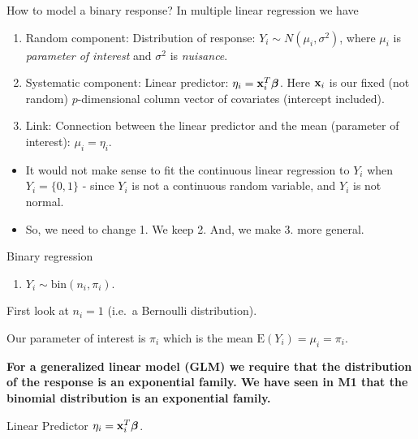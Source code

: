 \documentclass[
  ignorenonframetext,
]{beamer}
\providecommand{\tightlist}{%
  \setlength{\itemsep}{0pt}\setlength{\parskip}{0pt}}
\begin{document}
\begin{frame}{How to model a binary response?}
\protect\hypertarget{how-to-model-a-binary-response}{}
In multiple linear regression we have

\begin{enumerate}
\item
  Random component: Distribution of response:
  \(Y_i\sim N(\mu_i,\sigma^2)\), where \(\mu_i\) is \emph{parameter of
  interest} and \(\sigma^2\) is \emph{nuisance}.
\item
  Systematic component: Linear predictor:
  \(\eta_i={\bf x}_i^T \boldsymbol{\beta}\). Here \({\bf x}_i\) is our
  fixed (not random) \(p\)-dimensional column vector of covariates
  (intercept included).
\item
  Link: Connection between the linear predictor and the mean (parameter
  of interest): \(\mu_i=\eta_i\).
\end{enumerate}

\begin{itemize}
\tightlist
\item
  It would not make sense to fit the continuous linear regression to
  \(Y_i\) when \(Y_i=\{0,1\}\) - since \(Y_i\) is not a continuous
  random variable, and \(Y_i\) is not normal.
\item
  So, we need to change 1. We keep 2. And, we make 3. more general.
\end{itemize}
\end{frame}

\begin{frame}
\begin{block}{Binary regression}
\protect\hypertarget{binary-regression}{}
\begin{enumerate}
\tightlist
\item
  \(Y_i \sim \text{bin}(n_i,\pi_i)\).
\end{enumerate}

First look at \(n_i=1\) (i.e.~a Bernoulli distribution).

Our parameter of interest is \(\pi_i\) which is the mean
\(\text{E}(Y_i)=\mu_i=\pi_i\).

\textbf{For a generalized linear model (GLM) we require that the
distribution of the response is an exponential family. We have seen in
M1 that the binomial distribution is an exponential family.}
\end{block}
\end{frame}

\begin{frame}
\begin{block}{Linear Predictor}
\protect\hypertarget{linear-predictor}{}
\(\eta_i={\bf x}_i^T \boldsymbol{\beta}\).
\end{block}
\end{frame}
\end{document}
